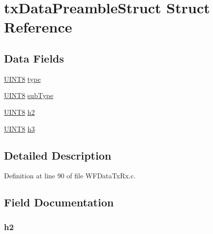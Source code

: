 \hypertarget{structtx_data_preamble_struct}{}\section{tx\+Data\+Preamble\+Struct Struct Reference}
\label{structtx_data_preamble_struct}
\subsection*{Data Fields}
\begin{DoxyCompactItemize}
\item 
\hyperlink{_generic_type_defs_8h_ab27e9918b538ce9d8ca692479b375b6a}{U\+I\+N\+T8} \hyperlink{structtx_data_preamble_struct_a631bceb766461ab7475c7ed56717aac8}{type}
\item 
\hyperlink{_generic_type_defs_8h_ab27e9918b538ce9d8ca692479b375b6a}{U\+I\+N\+T8} \hyperlink{structtx_data_preamble_struct_a6b8a16b4fff234af40d01cd46be5be45}{sub\+Type}
\item 
\hyperlink{_generic_type_defs_8h_ab27e9918b538ce9d8ca692479b375b6a}{U\+I\+N\+T8} \hyperlink{structtx_data_preamble_struct_aa733f05603f58e47440d472887bcf5e6}{h2}
\item 
\hyperlink{_generic_type_defs_8h_ab27e9918b538ce9d8ca692479b375b6a}{U\+I\+N\+T8} \hyperlink{structtx_data_preamble_struct_acaf992828672dce787d7d349490b9688}{h3}
\end{DoxyCompactItemize}


\subsection{Detailed Description}


Definition at line 90 of file W\+F\+Data\+Tx\+Rx.\+c.



\subsection{Field Documentation}
\hypertarget{structtx_data_preamble_struct_aa733f05603f58e47440d472887bcf5e6}{}
\subsubsection[{h2}]{ h2}\label{structtx_data_preamble_struct_aa733f05603f58e47440d472887bcf5e6}


